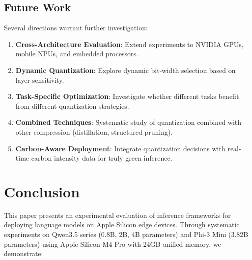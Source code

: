 \documentclass[11pt,a4paper]{article}
\begin{document}
\subsection{Future Work}

Several directions warrant further investigation:

\begin{enumerate}[leftmargin=*,nosep]
    \item \textbf{Cross-Architecture Evaluation}: Extend experiments to NVIDIA GPUs, mobile NPUs, and embedded processors.
    
    \item \textbf{Dynamic Quantization}: Explore dynamic bit-width selection based on layer sensitivity.
    
    \item \textbf{Task-Specific Optimization}: Investigate whether different tasks benefit from different quantization strategies.
    
    \item \textbf{Combined Techniques}: Systematic study of quantization combined with other compression (distillation, structured pruning).
    
    \item \textbf{Carbon-Aware Deployment}: Integrate quantization decisions with real-time carbon intensity data for truly green inference.
\end{enumerate}

\section{Conclusion}

This paper presents an experimental evaluation of inference frameworks for deploying language models on Apple Silicon edge devices. Through systematic experiments on Qwen3.5 series (0.8B, 2B, 4B parameters) and Phi-3 Mini (3.82B parameters) using Apple Silicon M4 Pro with 24GB unified memory, we demonstrate:
\end{document}
